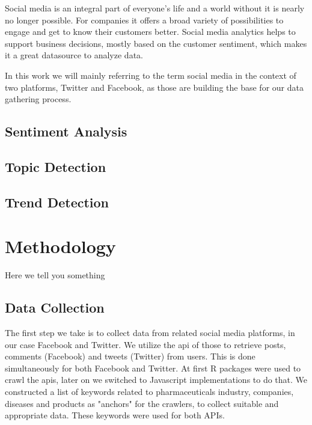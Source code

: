 \documentclass[11pt,titlepage,oneside,openany]{book}
\begin{document}
\noindent Social media is an integral part of everyone’s life and a world without it is nearly no longer possible. For companies it offers a broad variety of possibilities to engage and get to know their customers better. Social media analytics helps to support business decisions, mostly based on the customer sentiment, which makes it a great datasource to analyze data. \cite{Rouse2016-09-15}
\par
\noindent In this work we will mainly referring to the term social media in the context of two platforms, Twitter and Facebook, as those are building the base for our data gathering process. 



\section{Sentiment Analysis}
\label{sec:sentana}


\section{Topic Detection}
\label{sec:topdec}

\section{Trend Detection}
\label{sec:trenddec}


\chapter{Methodology}
\label{cha:methodology}

Here we tell you something



\section{Data Collection}
\label{sec:datacoll}

The first step we take is to collect data from related social media platforms, in our case Facebook and Twitter. We utilize the \acrfull{api} of those to retrieve posts, comments (Facebook) and tweets (Twitter) from users. This is done simultaneously for both Facebook and Twitter. At first R packages were used to crawl the \acrshort{api}s, later on we switched to Javascript implementations to do that. We constructed a list of keywords related to pharmaceuticals industry, companies, diseases and products as "anchors" for the crawlers, to collect suitable and appropriate data. These keywords were used for both APIs.
\end{document}
